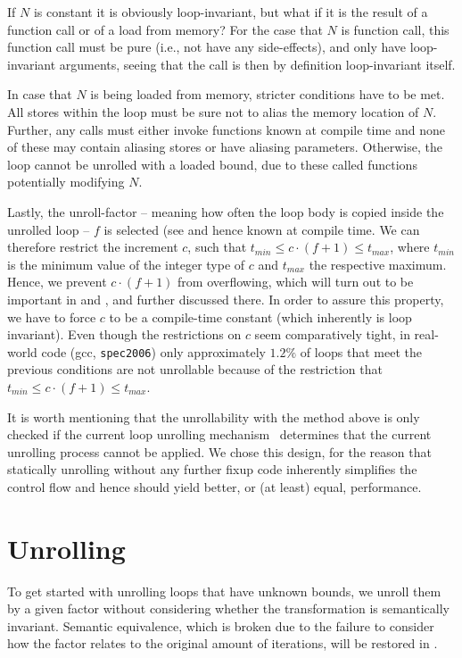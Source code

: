 If $N$ is constant it is obviously loop-invariant, but what if it is the result of a function call or of a load from memory?
For the case that $N$ is function call, this function call must be pure (i.e., not have any side-effects), and only have loop-invariant arguments, seeing that the call is then by definition loop-invariant itself.

In case that $N$ is being loaded from memory, stricter conditions have to be met.
All stores within the loop must be sure not to alias the memory location of $N$.
Further, any calls must either invoke functions known at compile time and none of these may contain aliasing stores or have aliasing parameters.
Otherwise, the loop cannot be unrolled with a loaded bound, due to these called functions potentially modifying $N$.

Lastly, the unroll-factor -- meaning how often the loop body is copied inside the unrolled loop -- $f$ is selected (see  and hence known at compile time.
We can therefore restrict the increment $c$, such that $t_{min} \leq c \cdot (f+1) \leq t_{max}$, where $t_{min}$ is the minimum value of the integer type of $c$ and $t_{max}$ the respective maximum.
Hence, we prevent $c \cdot (f + 1)$ from overflowing, which will turn out to be important in  and , and further discussed there.
In order to assure this property, we have to force $c$ to be a compile-time constant (which inherently is loop invariant).
Even though the restrictions on $c$ seem comparatively tight, in real-world code (gcc, \texttt{spec2006}) only approximately $1.2\%$ of loops that meet the previous conditions are not unrollable because of the restriction that  $t_{min} \leq c \cdot (f+1) \leq t_{max}$.

It is worth mentioning that the unrollability with the method above is only checked if the current loop unrolling mechanism~\cite{aebi18bachelorarbeit} determines that the current unrolling process cannot be applied.
We chose this design, for the reason that statically unrolling without any further fixup code inherently simplifies the control flow and hence should yield better, or (at least) equal, performance.

\section{Unrolling}\label{sec:impl:unroll}

To get started with unrolling loops that have unknown bounds, we unroll them by a given factor without considering whether the transformation is semantically invariant.
Semantic equivalence, which is broken due to the failure to consider how the factor relates to the original amount of iterations, will be restored in .

